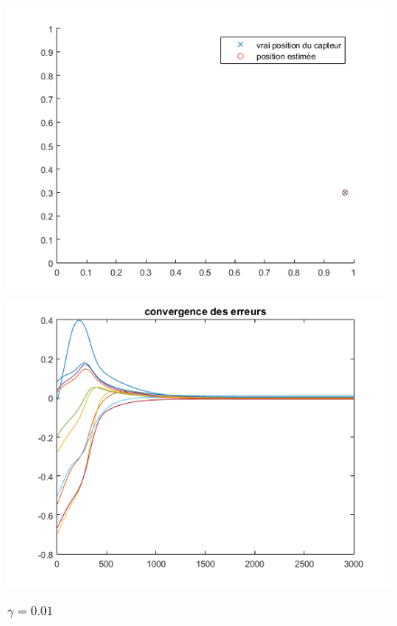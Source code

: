 \documentclass{article}
\begin{document}
\begin{figure}[!h]
\includegraphics[scale=0.35]{grad_gamma001.png} \includegraphics[scale=0.35]{grad_err_gamma001.png} 
\caption{$\gamma=0.01$}
\end{figure} 
\end{document}

